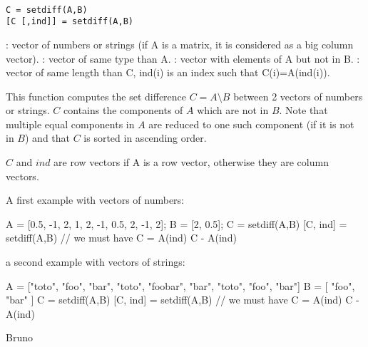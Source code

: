
\begin{mandesc}
   \\
\end{mandesc}

\begin{calling_sequence}
\begin{verbatim}
C = setdiff(A,B)
[C [,ind]] = setdiff(A,B)
\end{verbatim}
\end{calling_sequence}
\begin{parameters}
  \begin{varlist}
     : vector of numbers or strings (if A is a matrix, it is
    considered as a big column vector).
     : vector of same type than A.
     : vector with elements of A but not in B.
     : vector of same length than C, ind(i) is an index
                  such that C(i)=A(ind(i)).
  \end{varlist}
\end{parameters}

\begin{mandescription}
  This function computes the set difference $C = A \setminus B$
  between 2 vectors of numbers or strings. $C$ contains the components
  of $A$ which are not in $B$. Note that multiple equal components in
  $A$ are reduced to one such component (if it is not in $B$) and that
  $C$ is sorted in ascending order.

  $C$ and $ind$ are row vectors if  A is a row vector, otherwise they
  are column vectors.
  
\end{mandescription}

\begin{examples}

\noindent A first example with vectors of numbers:
  
  \begin{program}
    A = [0.5, -1, 2, 1, 2, -1, 0.5, 2, -1, 2];
    B = [2, 0.5];
    C = setdiff(A,B)
    [C, ind] = setdiff(A,B)
    // we must have C = A(ind)
    C - A(ind)
  \end{program}

\noindent   a second example with vectors of strings:
  
  \begin{program}
    A = ["toto", "foo", "bar", "toto", "foobar", "bar", "toto", "foo", "bar"]
    B = [ "foo", "bar" ]
    C = setdiff(A,B)
    [C, ind] = setdiff(A,B)
    // we must have C = A(ind)
    C - A(ind)
  \end{program}

\end{examples}

\begin{manseealso}
\end{manseealso}

\begin{authors}
   Bruno
\end{authors}
